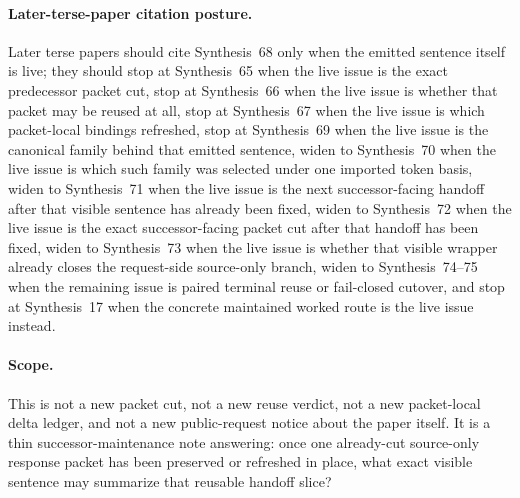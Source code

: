 \documentclass[11pt]{article}
\begin{document}
\paragraph{Later-terse-paper citation posture.}
Later terse papers should cite Synthesis~68 only when the emitted sentence itself is live; they should stop at Synthesis~65 when the live issue is the exact predecessor packet cut, stop at Synthesis~66 when the live issue is whether that packet may be reused at all, stop at Synthesis~67 when the live issue is which packet-local bindings refreshed, stop at Synthesis~69 when the live issue is the canonical family behind that emitted sentence, widen to Synthesis~70 when the live issue is which such family was selected under one imported token basis, widen to Synthesis~71 when the live issue is the next successor-facing handoff after that visible sentence has already been fixed, widen to Synthesis~72 when the live issue is the exact successor-facing packet cut after that handoff has been fixed, widen to Synthesis~73 when the live issue is whether that visible wrapper already closes the request-side source-only branch, widen to Synthesis~74--75 when the remaining issue is paired terminal reuse or fail-closed cutover, and stop at Synthesis~17 when the concrete maintained worked route is the live issue instead.

\paragraph{Scope.}
This is not a new packet cut, not a new reuse verdict, not a new packet-local delta ledger, and not a new public-request notice about the paper itself.
It is a thin successor-maintenance note answering: once one already-cut source-only response packet has been preserved or refreshed in place, what exact visible sentence may summarize that reusable handoff slice?
\end{document}
